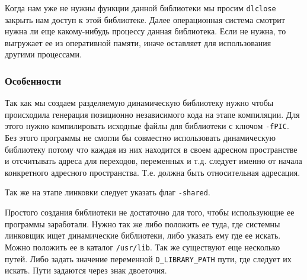 \documentclass[12pt]{article}
\begin{document}
    Когда нам уже не нужны функции данной библиотеки мы просим \verb|dlclose| закрыть нам доступ к этой библиотеке. Далее операционная система смотрит нужна ли еще какому-нибудь процессу данная библиотека. Если не нужна, то выгружает ее из оперативной памяти, иначе оставляет для использования другими процессами.

    \subsubsection*{Особенности}
    Так как мы создаем разделяемую динамическую библиотеку нужно чтобы происходила генерация позиционно независимого кода на этапе компиляции. Для этого нужно компилировать исходные файлы для библиотеки с ключом \verb|-fPIC|.
    Без этого программы не смогли бы совместно использовать динамическую библиотеку потому что каждая из них находится в своем адресном пространстве и отсчитывать адреса для переходов, переменных и т.д. следует именно от начала конкретного адресного пространства. Т.е. должна быть относительная адресация. 
    
    Так же на этапе линковки следует указать флаг \verb|-shared|.
    
    Простого создания библиотеки не достаточно для того, чтобы использующие ее программы заработали. Нужно так же либо положить ее туда, где системны линковщик ищет динамические библиотеки, либо указать ему где ее искать. Можно положить ее в каталог \verb|/usr/lib|. Так же существуют еще несколько путей. Либо задать значение переменной \verb|D_LIBRARY_PATH| пути, где следует их искать. Пути задаются через знак двоеточия.
\end{document}
